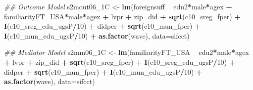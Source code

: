 \documentclass[
]{article}
\newenvironment{Shaded}{\begin{snugshade}}{\end{snugshade}}
\newcommand{\CommentTok}[1]{\textcolor[rgb]{0.56,0.35,0.01}{\textit{#1}}}
\newcommand{\DataTypeTok}[1]{\textcolor[rgb]{0.13,0.29,0.53}{#1}}
\newcommand{\DecValTok}[1]{\textcolor[rgb]{0.00,0.00,0.81}{#1}}
\newcommand{\KeywordTok}[1]{\textcolor[rgb]{0.13,0.29,0.53}{\textbf{#1}}}
\newcommand{\NormalTok}[1]{#1}
\newcommand{\OperatorTok}[1]{\textcolor[rgb]{0.81,0.36,0.00}{\textbf{#1}}}
\newcommand{\StringTok}[1]{\textcolor[rgb]{0.31,0.60,0.02}{#1}}
\begin{document}
\begin{Shaded}
\begin{Highlighting}[]
\CommentTok{## Outcome Model }
\NormalTok{s2mout06_1C <-}\StringTok{ }\KeywordTok{lm}\NormalTok{(foreignsuff  }\OperatorTok{~}\StringTok{ }\NormalTok{edu2}\OperatorTok{*}\NormalTok{male}\OperatorTok{*}\NormalTok{agex }\OperatorTok{+}\StringTok{ }\NormalTok{familiarityFT_USA}\OperatorTok{*}\NormalTok{male}\OperatorTok{*}\NormalTok{agex }\OperatorTok{+}\StringTok{ }\NormalTok{lvpr }\OperatorTok{+}\StringTok{  }
\StringTok{                    }\NormalTok{zip_did }\OperatorTok{+}\StringTok{ }\KeywordTok{sqrt}\NormalTok{(c10_sreg_fper) }\OperatorTok{+}\StringTok{ }\KeywordTok{I}\NormalTok{(c10_sreg_edu_ugsP}\OperatorTok{/}\DecValTok{10}\NormalTok{) }\OperatorTok{+}\StringTok{ }
\StringTok{                    }\NormalTok{didper }\OperatorTok{+}\StringTok{ }\KeywordTok{sqrt}\NormalTok{(c10_mun_fper) }\OperatorTok{+}\StringTok{ }\KeywordTok{I}\NormalTok{(c10_mun_edu_ugsP}\OperatorTok{/}\DecValTok{10}\NormalTok{) }\OperatorTok{+}\StringTok{ }
\StringTok{                    }\KeywordTok{as.factor}\NormalTok{(wave), }\DataTypeTok{data=}\NormalTok{sifcct)}

\CommentTok{## Mediator Model}
\NormalTok{s2mm06_1C <-}\StringTok{ }\KeywordTok{lm}\NormalTok{(familiarityFT_USA  }\OperatorTok{~}\StringTok{ }\NormalTok{edu2}\OperatorTok{*}\NormalTok{male}\OperatorTok{*}\NormalTok{agex }\OperatorTok{+}\StringTok{ }\NormalTok{lvpr }\OperatorTok{+}\StringTok{  }
\StringTok{                  }\NormalTok{zip_did }\OperatorTok{+}\StringTok{ }\KeywordTok{sqrt}\NormalTok{(c10_sreg_fper) }\OperatorTok{+}\StringTok{ }\KeywordTok{I}\NormalTok{(c10_sreg_edu_ugsP}\OperatorTok{/}\DecValTok{10}\NormalTok{) }\OperatorTok{+}\StringTok{ }
\StringTok{                  }\NormalTok{didper }\OperatorTok{+}\StringTok{ }\KeywordTok{sqrt}\NormalTok{(c10_mun_fper) }\OperatorTok{+}\StringTok{ }\KeywordTok{I}\NormalTok{(c10_mun_edu_ugsP}\OperatorTok{/}\DecValTok{10}\NormalTok{) }\OperatorTok{+}\StringTok{ }
\StringTok{                  }\KeywordTok{as.factor}\NormalTok{(wave), }\DataTypeTok{data=}\NormalTok{sifcct)}


\end{Highlighting}
\end{Shaded}
\end{document}
